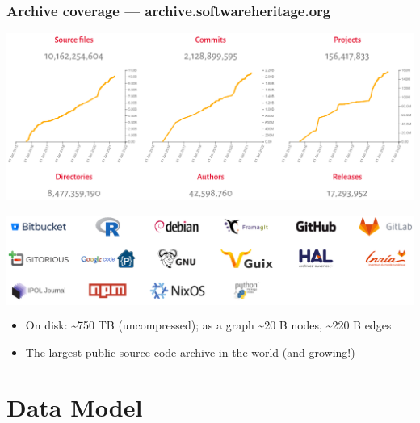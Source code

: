 \documentclass[aspectratio=169,xcolor=table]{beamer}
\begin{document}
    \begin{frame}
        \frametitle{Archive coverage --- archive.softwareheritage.org}
        \begin{center}
            \includegraphics[trim=0 2cm 0 0, clip, width=0.7\linewidth]{img/archive-growth.png}
        \end{center}
        \begin{center}
            \colorbox{white}{\includegraphics[width=0.8\linewidth]{img/archive-coverage.png}}
        \end{center}
        \vspace{-2mm}
        \begin{block}{}
            \begin{itemize}
                \item On disk: \textasciitilde{}750 TB (uncompressed); as a
                    graph \textasciitilde{}20 B nodes, \textasciitilde{}220 B
                    edges
                \item The largest public source code archive in the world (and
                    growing!)
            \end{itemize}
        \end{block}
    \end{frame}



    \section{Data Model}
\end{document}
